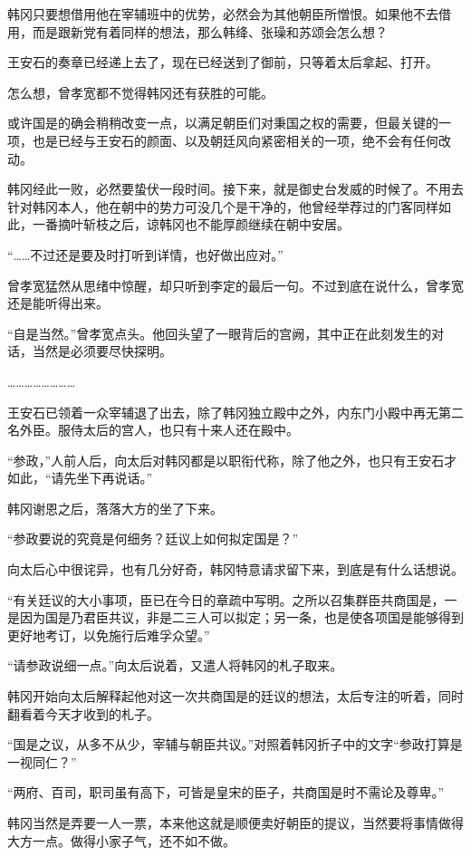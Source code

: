 韩冈只要想借用他在宰辅班中的优势，必然会为其他朝臣所憎恨。如果他不去借用，而是跟新党有着同样的想法，那么韩绛、张璪和苏颂会怎么想？

王安石的奏章已经递上去了，现在已经送到了御前，只等着太后拿起、打开。

怎么想，曾孝宽都不觉得韩冈还有获胜的可能。

或许国是的确会稍稍改变一点，以满足朝臣们对秉国之权的需要，但最关键的一项，也是已经与王安石的颜面、以及朝廷风向紧密相关的一项，绝不会有任何改动。

韩冈经此一败，必然要蛰伏一段时间。接下来，就是御史台发威的时候了。不用去针对韩冈本人，他在朝中的势力可没几个是干净的，他曾经举荐过的门客同样如此，一番摘叶斩枝之后，谅韩冈也不能厚颜继续在朝中安居。

“……不过还是要及时打听到详情，也好做出应对。”

曾孝宽猛然从思绪中惊醒，却只听到李定的最后一句。不过到底在说什么，曾孝宽还是能听得出来。

“自是当然。”曾孝宽点头。他回头望了一眼背后的宫阙，其中正在此刻发生的对话，当然是必须要尽快探明。

……………………

王安石已领着一众宰辅退了出去，除了韩冈独立殿中之外，内东门小殿中再无第二名外臣。服侍太后的宫人，也只有十来人还在殿中。

“参政，”人前人后，向太后对韩冈都是以职衔代称，除了他之外，也只有王安石才如此，“请先坐下再说话。”

韩冈谢恩之后，落落大方的坐了下来。

“参政要说的究竟是何细务？廷议上如何拟定国是？”

向太后心中很诧异，也有几分好奇，韩冈特意请求留下来，到底是有什么话想说。

“有关廷议的大小事项，臣已在今日的章疏中写明。之所以召集群臣共商国是，一是因为国是乃君臣共议，非是二三人可以拟定；另一条，也是使各项国是能够得到更好地考订，以免施行后难孚众望。”

“请参政说细一点。”向太后说着，又遣人将韩冈的札子取来。

韩冈开始向太后解释起他对这一次共商国是的廷议的想法，太后专注的听着，同时翻看着今天才收到的札子。

“国是之议，从多不从少，宰辅与朝臣共议。”对照着韩冈折子中的文字“参政打算是一视同仁？”

“两府、百司，职司虽有高下，可皆是皇宋的臣子，共商国是时不需论及尊卑。”

韩冈当然是弄要一人一票，本来他这就是顺便卖好朝臣的提议，当然要将事情做得大方一点。做得小家子气，还不如不做。

